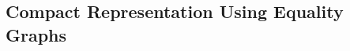 \begin{comment}
\begin{definition}\label{screening:rw-limited-equiv}
Given a rewrite rule group $G_\Rewrite$ and a set of terms from a language $\Terms \subseteq \Lang$, we define a relation $\TLRewriteSysRelation{}{} \eqdef {\TRewriteSysRelation{}{}\!} \cap {\left(\Terms \times \Terms \right)}$
\end{definition}

Even $\TLRewriteSysRelation{}{}$ is too hard to compute, since for $t_1,t_2\in\Terms$ satisfying
$\RewriteRelation{t_1}{t_2}$, the path between them may include terms from $\Lang\setminus\Terms$.
Even if there exists a path that is properly in $\Terms$, it may be very long (worst case $|\Terms|$).
We therefore define the \emph{rewrite search space} as

\begin{equation}
    \TRewriteSysRelationBounded{}{}{d} \,=~
    \left({\RewriteRewriteSysRelation{}{}}\right)^{\leq d}
     \cap~ {(\Terms \times \Terms)}
\end{equation}

Where $R^{\leq d}=\bigcup_{0\leq i\leq d}R^i$.

\medskip

Notice that $t_1 \TRewriteSysRelationBounded{}{}{d}\!\! t_2$ does not essentially mean that there exists
a path of rewrites 
$\ARewriteRewriteSysRelation{t_1}{\ARewriteRewriteSysRelation{t_1'}{\cdots}\ARewriteRewriteSysRelation{}{t_2}}$ 
of length $\leq d$.
This is because $\ARewriteRewriteSysRelation{}{}$ itself may not be symmetric.
It is not even necessarily the case that there exists a common term $t_3$ such that both $t_1$ and
$t_2$ rewrite to $t_3$; the direction of rewrites may interleave arbitrarily in 
$\TRewriteSysRelationBounded{}{}{d}$.
\end{comment}

\subsection{Compact Representation Using Equality Graphs}
\label{screening:representation}

